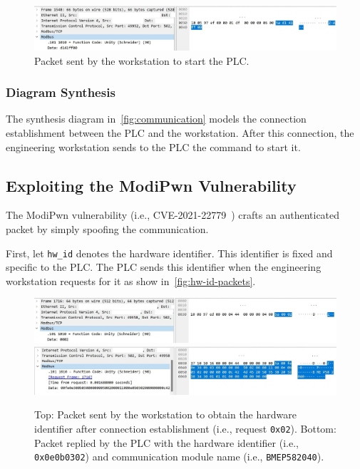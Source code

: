 \begin{figure}[H]
    \centering
    \includegraphics[width=\linewidth]{figures/plc-starts.jpg}
    \caption{Packet sent by the workstation to start the PLC.}
    \label{fig:start-plc}
\end{figure}

\subsubsection{Diagram Synthesis}

The synthesis diagram in~\autoref{fig:communication} models the connection establishment between the PLC and the workstation. After this connection, the engineering workstation sends to the PLC the command to start it. 

\subsection{Exploiting the ModiPwn Vulnerability}

The ModiPwn vulnerability (i.e., CVE-2021-22779~\cite{modipwn-cve-details}) crafts an authenticated packet by simply spoofing the communication. 

First, let \texttt{hw\_id} denotes the hardware identifier. This identifier is fixed and specific to the PLC. The PLC sends this identifier when the engineering workstation requests for it as show in~\autoref{fig:hw-id-packets}.

\begin{figure}[H]
    \centering
    \includegraphics[width=\linewidth]{figures/ask-hw-id}
    \\ \vspace{1cm}
    \includegraphics[width=\linewidth]{figures/send-hw-id}
    \caption{Top: Packet sent by the workstation to obtain the hardware identifier after connection establishment (i.e., request \texttt{0x02}). Bottom: Packet replied by the PLC with the hardware identifier (i.e., \texttt{0x0e0b0302}) and communication module name (i.e., \texttt{BMEP582040}).}
    \label{fig:hw-id-packets}
\end{figure}

